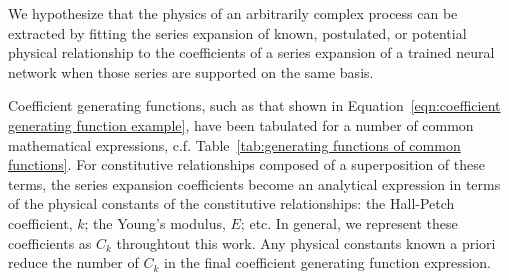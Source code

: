 \begin{hypothesis}
We hypothesize that the physics of an arbitrarily complex process can be extracted by fitting the series expansion of known, postulated, or potential physical relationship to the coefficients of a series expansion of a trained neural network when those series are supported on the same basis.
\end{hypothesis}

Coefficient generating functions, such as that shown in Equation~\ref{eqn:coefficient generating function example}, have been tabulated for a number of common mathematical expressions, c.f. Table~\ref{tab:generating functions of common functions}. For constitutive relationships composed of a superposition of these terms, the series expansion coefficients become an analytical expression in terms of the physical constants of the constitutive relationships: the Hall-Petch coefficient, $k$; the Young's modulus, $E$; etc. In general, we represent these coefficients as $C_k$ throughtout this work. Any physical constants known a priori reduce the number of $C_k$ in the final coefficient generating function expression.
